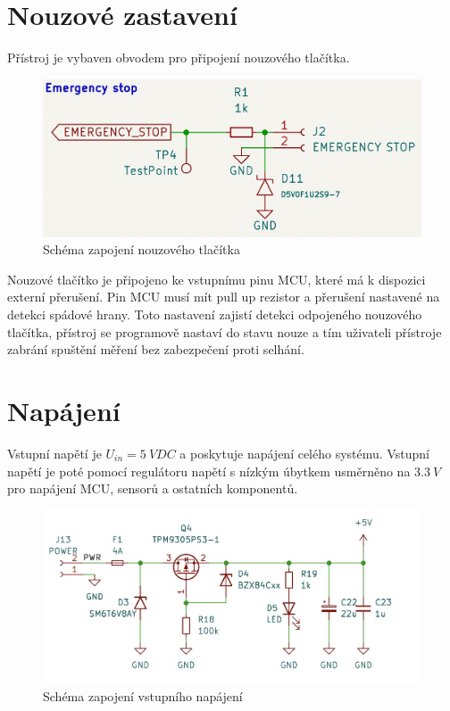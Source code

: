 \section{Nouzové zastavení}
Přístroj je vybaven obvodem pro připojení nouzového tlačítka.
\begin{figure}[H]
    \includegraphics[width=0.9\linewidth]{pictures/e_stop.jpg}
    \caption{Schéma zapojení nouzového tlačítka}
    \label{fig:e_stop}
\end{figure}
Nouzové tlačítko je připojeno ke vstupnímu pinu MCU, které má k dispozici externí přerušení. Pin MCU musí mít pull up rezistor a přerušení nastavené na detekci spádové hrany. Toto nastavení zajistí
detekci odpojeného nouzového tlačítka, přístroj se programově nastaví do stavu nouze a tím uživateli přístroje zabrání spuštění měření bez zabezpečení proti selhání.
\section{Napájení}
Vstupní napětí je $U_{in} = 5 \ V DC$ a poskytuje napájení celého systému. Vstupní napětí je poté pomocí regulátoru napětí s nízkým úbytkem usměrněno na $3.3 \ V$ pro napájení MCU, sensorů a ostatních komponentů.

\begin{figure}[H]
    \includegraphics[width=0.9\linewidth]{pictures/power.jpg}
    \caption{Schéma zapojení vstupního napájení}
    \label{fig:power_input}
\end{figure}

